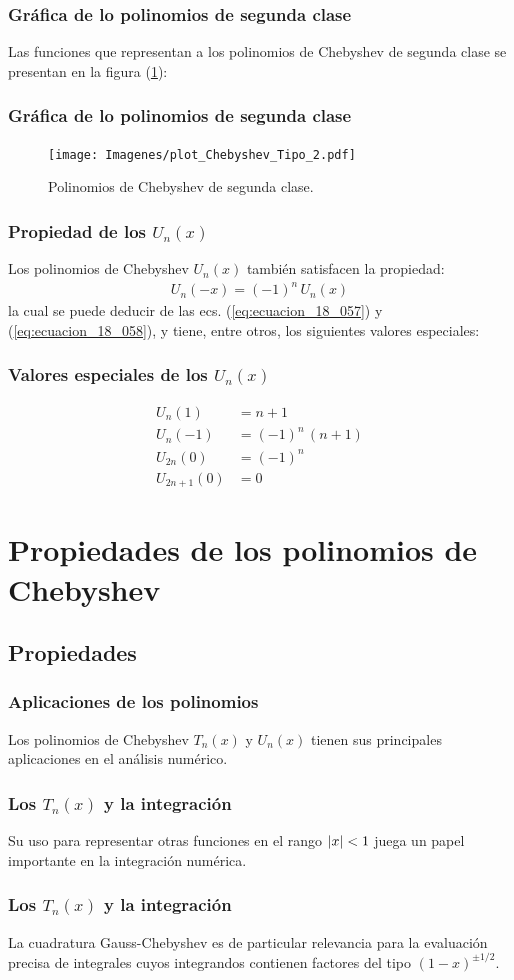\documentclass[12pt]{beamer}
\begin{document}
\begin{frame}
\frametitle{Gráfica de lo polinomios de segunda clase}
Las funciones que representan a los polinomios de Chebyshev de segunda clase se presentan en la figura (\ref{fig:figura_plot_chebychev_02}):
\end{frame}
\begin{frame}
\frametitle{Gráfica de lo polinomios de segunda clase}
\begin{figure}[H]
    \centering
    \texttt{[image: Imagenes/plot\_Chebyshev\_Tipo\_2.pdf]}
    \caption{Polinomios de Chebyshev de segunda clase.}
    \label{fig:figura_plot_chebychev_02}
\end{figure}
\end{frame}
\begin{frame}
\frametitle{Propiedad de los $U_{n} (x)$}
Los polinomios de Chebyshev $U_{n} (x)$ también satisfacen la propiedad:
\pause
\begin{align*}
U_{n} (-x) = (-1)^{n} \, U_{n} (x)
\end{align*}
la cual se puede deducir de las ecs. (\ref{eq:ecuacion_18_057}) y (\ref{eq:ecuacion_18_058}), y tiene, entre otros, los siguientes valores especiales:
\end{frame}
\begin{frame}
\frametitle{Valores especiales de los $U_{n} (x)$}
\begin{align*}
U_{n} (1) &= n + 1 \\[0.5em]
U_{n} (-1) &= (-1)^{n} \, (n + 1) \\[0.5em]
U_{2n} (0) &= (-1)^{n} \\[0.5em]
U_{2n+1} (0) &= 0
\end{align*}
\end{frame}

\section{Propiedades de los polinomios de Chebyshev}
\subsection{Propiedades}

\begin{frame}
\frametitle{Aplicaciones de los polinomios}
Los polinomios de Chebyshev $T_{n} (x)$ y $U_{n} (x)$ tienen sus principales aplicaciones en el análisis numérico.
\end{frame}
\begin{frame}
\frametitle{Los $T_{n} (x)$ y la integración}
Su uso para representar otras funciones en el rango $\abs{x} < 1$ juega un papel importante en la integración numérica.
\end{frame}
\begin{frame}
\frametitle{Los $T_{n} (x)$ y la integración}
La cuadratura Gauss-Chebyshev es de particular relevancia para la evaluación precisa de integrales cuyos integrandos contienen factores del tipo $(1 - x)^{\pm 1/2}$.
\end{frame}
\end{document}
